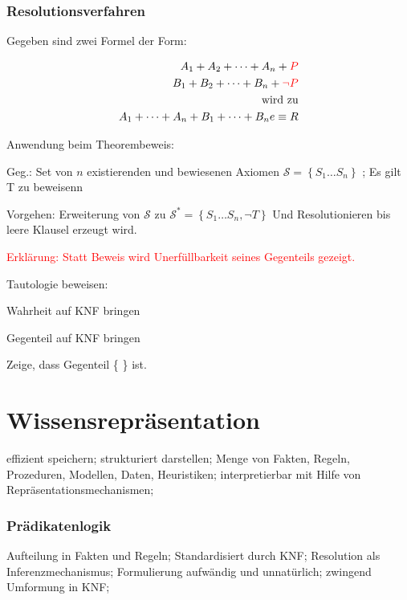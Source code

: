 \documentclass[german,color,6pt]{latex4ei/latex4ei_sheet}
\begin{document}
\begin{sectionbox}
\subsubsection{Resolutionsverfahren}
Gegeben sind zwei Formel der Form: 

\begin{equation*}
\begin{split}
	A_1 + A_2 + \dots + A_n + \textcolor{red}{ P } \\
	B_1 + B_2 + \dots + B_n + \textcolor{red}{ \neg P } \\
	\text{wird zu} \\
	A_1 + \dots  + A_n + B_1 + \dots +  B_n e\equiv R
\end{split}
\end{equation*}

Anwendung beim Theorembeweis: 

Geg.: Set von $n$ existierenden und bewiesenen Axiomen $\mathcal S = \left\{S_1 \dots S_n \right\}$ ; Es gilt T zu beweisenn

Vorgehen: Erweiterung von $\mathcal S $ zu $\mathcal S^* = \left\{S_1 \dots S_n , \neg T \right\}$ Und Resolutionieren bis leere Klausel erzeugt wird. 

\textcolor{red}{Erklärung: Statt Beweis wird Unerfüllbarkeit seines Gegenteils gezeigt. }

\begin{cookbox}{Tautologie beweisen: }
	\item Wahrheit auf KNF bringen
	\item Gegenteil auf KNF bringen
	\item Zeige, dass Gegenteil \{ \} ist. 
\end{cookbox}
\end{sectionbox}

\section{Wissensrepräsentation}
\begin{symbolbox}
effizient speichern; strukturiert darstellen; Menge von Fakten, Regeln, Prozeduren, Modellen, Daten, Heuristiken; interpretierbar mit Hilfe von Repräsentationsmechanismen; 
\end{symbolbox}

\begin{sectionbox}
\subsubsection{Prädikatenlogik}
Aufteilung in Fakten und Regeln; Standardisiert durch KNF; Resolution als Inferenzmechanismus; Formulierung aufwändig und unnatürlich; zwingend Umformung in KNF;
\end{sectionbox}
\end{document}
